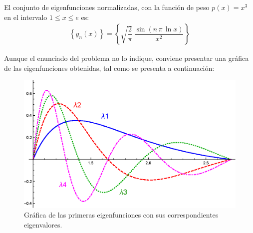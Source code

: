 \begin{ejemplo}
El conjunto de eigenfunciones normalizadas, con la función de peso $p(x) = x^{3}$ en el intervalo $1 \leq x \leq e$ es:
\begin{align*}
\left\{ y_{n} (x) \right\} = \left\{ \sqrt{\dfrac{2}{\pi}} \, \dfrac{\sin (n \, \pi \, \ln x)}{x^{2}} \right\}
\end{align*}

Aunque el enunciado del problema no lo indique, conviene presentar una gráfica de las eigenfunciones obtenidas, tal como se presenta a continuación:
\begin{figure}[H]
    \centering
    \includegraphics[scale=0.85]{Imagenes/Ejercicio_SL_01_Funciones.eps}
    \caption{Gráfica de las primeras eigenfunciones con sus correspondientes eigenvalores.}
    \label{fig:figura_}
\end{figure}
\end{ejemplo}
